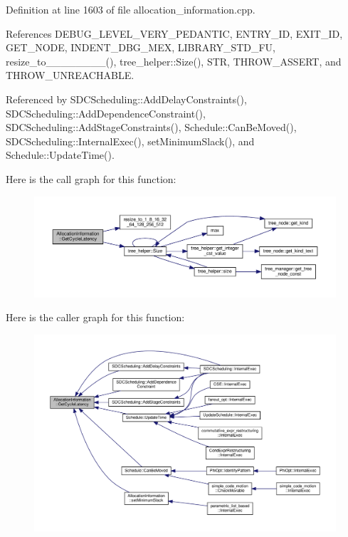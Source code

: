 Definition at line 1603 of file allocation\+\_\+information.\+cpp.



References D\+E\+B\+U\+G\+\_\+\+L\+E\+V\+E\+L\+\_\+\+V\+E\+R\+Y\+\_\+\+P\+E\+D\+A\+N\+T\+IC, E\+N\+T\+R\+Y\+\_\+\+ID, E\+X\+I\+T\+\_\+\+ID, G\+E\+T\+\_\+\+N\+O\+DE, I\+N\+D\+E\+N\+T\+\_\+\+D\+B\+G\+\_\+\+M\+EX, L\+I\+B\+R\+A\+R\+Y\+\_\+\+S\+T\+D\+\_\+\+FU, resize\+\_\+to\+\_\+\_\+\_\+\_\+\_\+\_\+\_\+\_(), tree\+\_\+helper\+::\+Size(), S\+TR, T\+H\+R\+O\+W\+\_\+\+A\+S\+S\+E\+RT, and T\+H\+R\+O\+W\+\_\+\+U\+N\+R\+E\+A\+C\+H\+A\+B\+LE.



Referenced by S\+D\+C\+Scheduling\+::\+Add\+Delay\+Constraints(), S\+D\+C\+Scheduling\+::\+Add\+Dependence\+Constraint(), S\+D\+C\+Scheduling\+::\+Add\+Stage\+Constraints(), Schedule\+::\+Can\+Be\+Moved(), S\+D\+C\+Scheduling\+::\+Internal\+Exec(), set\+Minimum\+Slack(), and Schedule\+::\+Update\+Time().

Here is the call graph for this function\+:
\nopagebreak
\begin{figure}[H]
\begin{center}
\leavevmode
\includegraphics[width=350pt]{d7/d79/classAllocationInformation_a317fc959fa03d6e4c9e66c4091a2bff5_cgraph}
\end{center}
\end{figure}
Here is the caller graph for this function\+:
\nopagebreak
\begin{figure}[H]
\begin{center}
\leavevmode
\includegraphics[width=350pt]{d7/d79/classAllocationInformation_a317fc959fa03d6e4c9e66c4091a2bff5_icgraph}
\end{center}
\end{figure}
\mbox{\label{classAllocationInformation_aa2a901ccb4d9b6932dbd9ec2c89f2998}} 
